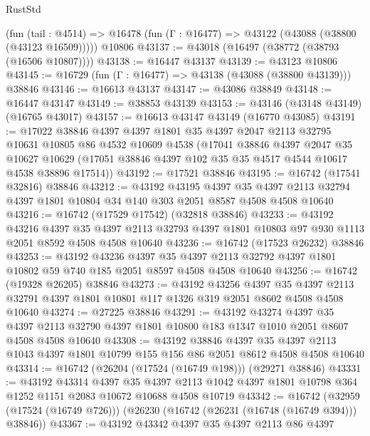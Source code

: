\begin{lexlean}{RustStd}
\begin{coremodule}
{\begin{coremodule}
{{{{{{{{{{{{{{{{{{{{{{{{{{{{{{{{{{{{{{{{{{{{{{{{{{{{{{{    (fun (tail : @4514) => @16478 (fun (Γ : @16477) => @43122 (@43088 (@38800 (@43123 @16509)))))
    @10806
@43137 := @43018 (@16497 (@38772 (@38793 (@16506 @10807))))
@43138 := @16447 @43137
@43139 := @43123 @10806
@43145 := @16729 (fun (Γ : @16477) => @43138 (@43088 (@38800 @43139))) @38846
@43146 := @16613 @43137
@43147 := @43086 @38849
@43148 := @16447 @43147
@43149 := @38853 @43139
@43153 := @43146 (@43148 @43149) (@16765 @43017)
@43157 := @16613 @43147 @43149 (@16770 @43085)
@43191 := @17022
    @38846
    @4397
    @4397
    @1801
    @35
    @4397
    @2047
    @2113
    @32795
    @10631
    @10805
    @86
    @4532
    @10609
    @4538
    (@17041
      @38846
      @4397
      @2047
      @35
      @10627
      @10629
      (@17051 @38846 @4397 @102 @35 @35 @4517 @4544 @10617 @4538 @38896 @17514))
@43192 := @17521 @38846
@43195 := @16742 (@17541 @32816) @38846
@43212 := @43192
    @43195
    @4397
    @35
    @4397
    @2113
    @32794
    @4397
    @1801
    @10804
    @34
    @140
    @303
    @2051
    @8587
    @4508
    @4508
    @10640
@43216 := @16742 (@17529 @17542) (@32818 @38846)
@43233 := @43192
    @43216
    @4397
    @35
    @4397
    @2113
    @32793
    @4397
    @1801
    @10803
    @97
    @930
    @1113
    @2051
    @8592
    @4508
    @4508
    @10640
@43236 := @16742 (@17523 @26232) @38846
@43253 := @43192
    @43236
    @4397
    @35
    @4397
    @2113
    @32792
    @4397
    @1801
    @10802
    @59
    @740
    @185
    @2051
    @8597
    @4508
    @4508
    @10640
@43256 := @16742 (@19328 @26205) @38846
@43273 := @43192
    @43256
    @4397
    @35
    @4397
    @2113
    @32791
    @4397
    @1801
    @10801
    @117
    @1326
    @319
    @2051
    @8602
    @4508
    @4508
    @10640
@43274 := @27225 @38846
@43291 := @43192
    @43274
    @4397
    @35
    @4397
    @2113
    @32790
    @4397
    @1801
    @10800
    @183
    @1347
    @1010
    @2051
    @8607
    @4508
    @4508
    @10640
@43308 := @43192
    @38846
    @4397
    @35
    @4397
    @2113
    @1043
    @4397
    @1801
    @10799
    @155
    @156
    @86
    @2051
    @8612
    @4508
    @4508
    @10640
@43314 := @16742 (@26204 (@17524 (@16749 @198))) (@29271 @38846)
@43331 := @43192
    @43314
    @4397
    @35
    @4397
    @2113
    @1042
    @4397
    @1801
    @10798
    @364
    @1252
    @1151
    @2083
    @10672
    @10688
    @4508
    @10719
@43342 := @16742
    (@32959 (@17524 (@16749 @726)))
    (@26230 (@16742 (@26231 (@16748 (@16749 @394))) @38846))
@43367 := @43192
    @43342
    @4397
    @35
    @4397
    @2113
    @86
    @4397
}}}}}}}}}}}}}}}}}}}}}}}}}}}}}}}}}}}}}}}}}}}}}}}}}}}}}}}
\end{coremodule}}
\end{coremodule}
\end{lexlean}

